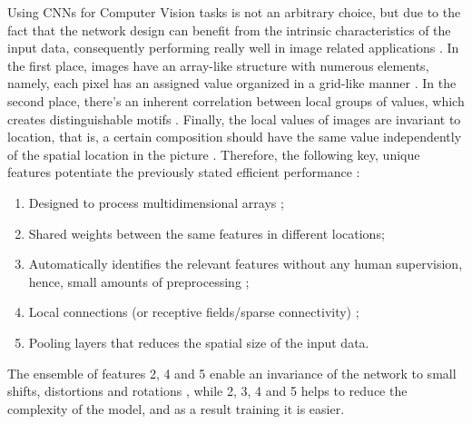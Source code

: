 \documentclass[class=report, crop=false, a4paper, 12pt]{standalone}
\begin{document}
\par Using CNNs for Computer Vision tasks is not an arbitrary choice, but due to the fact that the network design can benefit from the intrinsic characteristics of the input data, consequently performing really well in image related applications \autocite{lecunDeepLearning2015,caoReviewNeuralNetworks2018}. In the first place, images have an array-like structure with numerous elements, namely, each pixel has an assigned value organized in a grid-like manner \autocite{yamashitaConvolutionalNeuralNetworks2018}. In the second place, there's an inherent correlation between local groups of values, which creates distinguishable motifs \autocite{lecunDeepLearning2015}. Finally, the local values of images are invariant to location, that is, a certain composition should have the same value independently of the spatial location in the picture \autocite{lecunDeepLearning2015}. Therefore, the following key, unique features potentiate the previously stated efficient performance \autocite{caoReviewNeuralNetworks2018}:
\begin{enumerate}
    \item Designed to process multidimensional arrays \autocite{lecunDeepLearning2015};
    \item Shared weights between the same features in different locations; %
    \item Automatically identifies the relevant features without any human supervision, hence, small amounts of preprocessing \autocite{alzubaidiReviewDeepLearning2021,liSurveyConvolutionalNeural2022}; %
    \item Local connections (or receptive fields/sparse connectivity) \autocite{alzubaidiReviewDeepLearning2021}; %
    \item Pooling layers that reduces the spatial size of the input data. %
\end{enumerate}

The ensemble of features 2, 4 and 5 enable an invariance of the network to small shifts, distortions and rotations \autocite{guRecentAdvancesConvolutional2018,lecunDeepLearning2015}, while 2, 3, 4 and 5 helps to reduce the complexity of the model, and as a result training it is easier\autocite{guRecentAdvancesConvolutional2018,liSurveyConvolutionalNeural2022}.
\end{document}
